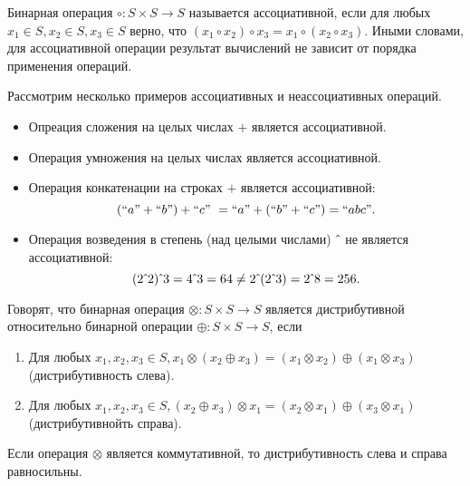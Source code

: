 \begin{definition}[Ассоциативность]
Бинарная операция $\circ : S \times S \to S$ называется ассоциативной, если для любых  $x_1 \in S, x_2 \in S, x_3 \in S$ верно, что  $(x_1 \circ x_2) \circ x_3 = x_1 \circ (x_2 \circ x_3)$. Иными словами, для ассоциативной операции результат вычислений не зависит от порядка применения операций.
\end{definition}

\begin{example} Рассмотрим несколько примеров ассоциативных и неассоциативных операций.
	\begin{itemize}
		\item Опреация сложения на целых числах $+$ является ассоциативной.
		\item Операция умножения на целых числах является ассоциативной.
		\item Операция конкатенации на строках $+$ является ассоциативной: $$(``a" + ``b") + ``c" \ = ``a" + (``b" + ``c") = ``abc" .$$
		\item Операция возведения в степень (над целыми числами) $\hat{\mkern6mu}$ не является ассоциативной:
		$$(2\hat{\mkern6mu}2)\hat{\mkern6mu}3 = 4 \hat{\mkern6mu} 3 = 64 \neq 2\hat{\mkern6mu}(2\hat{\mkern6mu}3) = 2 \hat{\mkern6mu} 8  = 256.$$
	\end{itemize}
\end{example}


\begin{definition}[Дистрибутивность]
Говорят, что бинарная операция $\otimes : S \times S \to S$ является дистрибутивной относительно бинарной операции $\oplus : S \times S \to S$, если 
\begin{enumerate}
	\item Для любых $x_1,x_2,x_3 \in S, x_1 \otimes (x_2 \oplus x_3) = (x_1 \otimes x_2) \oplus (x_1 \otimes x_3)$ (дистрибутивность слева).
	\item Для любых $x_1,x_2,x_3 \in S, (x_2 \oplus x_3) \otimes x_1 = (x_2 \otimes x_1) \oplus (x_3 \otimes x_1)$ (дистрибутивнойть справа).
\end{enumerate}

Если операция $\otimes$ является коммутативной, то дистрибутивность слева и справа равносильны. 

\end{definition}

